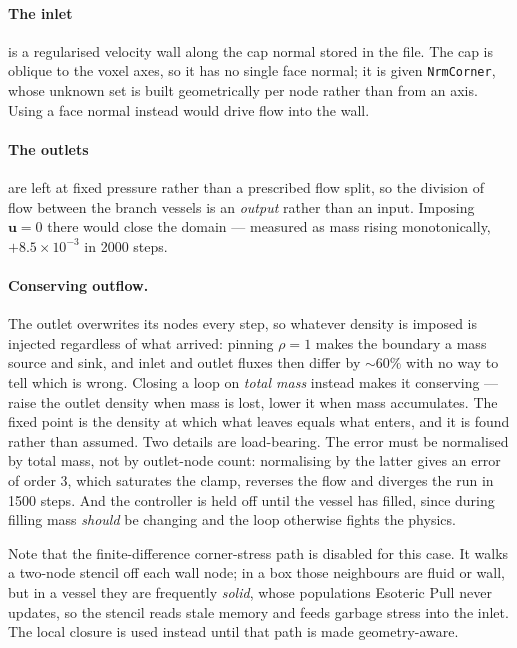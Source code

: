 \documentclass[11pt,a4paper]{article}
\newcommand{\code}[1]{\texttt{\small #1}}
\newcommand{\uu}{\bm{u}}
\newcommand{\e}[1]{\times 10^{#1}}
\begin{document}
\paragraph{The inlet} is a regularised velocity wall along the cap normal stored
in the file. The cap is oblique to the voxel axes, so it has no single face
normal; it is given \code{NrmCorner}, whose unknown set is built geometrically
per node rather than from an axis. Using a face normal instead would drive flow
into the wall.

\paragraph{The outlets} are left at fixed pressure rather than a prescribed flow
split, so the division of flow between the branch vessels is an \emph{output}
rather than an input. Imposing $\uu=0$ there would close the domain --- measured
as mass rising monotonically, $+8.5\e{-3}$ in 2000 steps.

\paragraph{Conserving outflow.} The outlet overwrites its nodes every step, so
whatever density is imposed is injected regardless of what arrived: pinning
$\rho=1$ makes the boundary a mass source and sink, and inlet and outlet fluxes
then differ by ${\sim}60\%$ with no way to tell which is wrong. Closing a loop on
\emph{total mass} instead makes it conserving --- raise the outlet density when
mass is lost, lower it when mass accumulates. The fixed point is the density at
which what leaves equals what enters, and it is found rather than assumed. Two
details are load-bearing. The error must be normalised by total mass, not by
outlet-node count: normalising by the latter gives an error of order $3$, which
saturates the clamp, reverses the flow and diverges the run in 1500 steps. And
the controller is held off until the vessel has filled, since during filling mass
\emph{should} be changing and the loop otherwise fights the physics.

Note that the finite-difference corner-stress path is disabled for this case. It
walks a two-node stencil off each wall node; in a box those neighbours are fluid
or wall, but in a vessel they are frequently \emph{solid}, whose populations
Esoteric Pull never updates, so the stencil reads stale memory and feeds garbage
stress into the inlet. The local closure is used instead until that path is made
geometry-aware.
\end{document}
